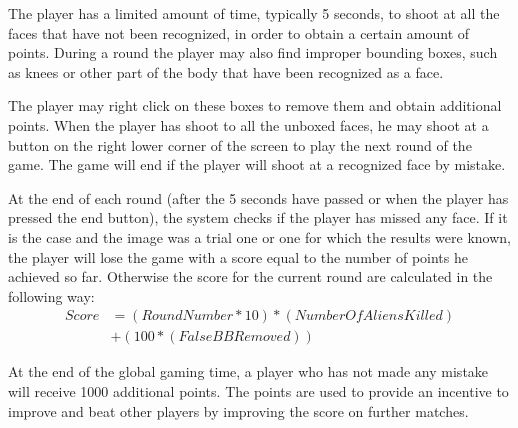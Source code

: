 The player has a limited amount of time, typically 5 seconds, to shoot at all the
faces that have not been recognized, in order to obtain a certain amount of points.
During a round the player may also find improper bounding boxes, such as knees or
other part of the body that have been recognized as a face.

The player may right click on these boxes to remove them and obtain additional
points. When the player has shoot to all the unboxed faces, he may shoot at a
button on the right lower corner of the screen to play the next round of the game.
The game will end if the player will shoot at a recognized face by mistake.

At the end of each round (after the 5 seconds have passed or when the player has
pressed the end button), the system checks if the player has missed any face. If
it is the case and the image was a trial one or one for which the results were
known, the player will lose the game with a score equal to the number of points
he achieved so far. Otherwise the score for the current round are calculated in
the following way:
\begin{equation}
\begin{split}
    Score &= (RoundNumber*10)*(NumberOfAliensKilled)\\
          &+(100*(FalseBBRemoved))
\end{split}
\end{equation}

At the end of the global gaming time, a player who has not made any mistake will
receive 1000 additional points. The points are used to provide an incentive to
improve and beat other players by improving the score on further matches.